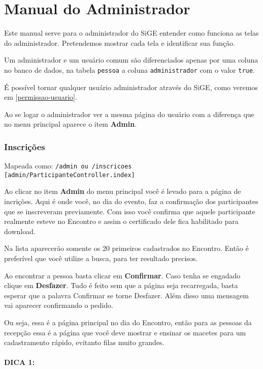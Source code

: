 \section{Manual do Administrador}

Este manual serve para o administrador do SiGE entender como funciona as
telas do administrador. Pretendemos mostrar cada tela e identificar sua
função.

Um administrador e um usuário comum são diferenciados apenas por uma
coluna no banco de dados, na tabela \texttt{pessoa} a coluna
\texttt{administrador} com o valor \texttt{true}.

É possível tornar qualquer usuário administrador através do SiGE, como
veremos em \ref{permissao-usuario}.

Ao se logar o administrador ver a mesma página do usuário com a
diferença que no menu principal aparece o item \textbf{Admin}.

\subsubsection{Inscrições \label{inscricoes}}

Mapeada como:
\texttt{/admin ou /inscricoes {[}admin/ParticipanteController.index{]}}

Ao clicar no item \textbf{Admin} do menu principal você é levado para a
página de incrições. Aqui é onde você, no dia do evento, faz a
confirmação dos participantes que se inscreveram previamente. Com isso
você confirma que aquele participante realmente esteve no Encontro e
assim o certificado dele fica habilitado para download.

Na lista aparecerão somente os 20 primeiros cadastrados no Encontro.
Então é preferível que você utilize a busca, para ter resultado
precisos.

Ao encontrar a pessoa basta clicar em \textbf{Confirmar}. Caso tenha se
engadado clique em \textbf{Desfazer}. Tudo é feito sem que a página seja
recarregada, basta esperar que a palavra Confirmar se torne Desfazer.
Além disso uma mensagem vai aparecer confirmando o pedido.

Ou seja, essa é a página principal no dia do Encontro, então para as
pessoas da recepção essa é a página que você deve mostrar e ensinar os
macetes para um cadastramento rápido, evitanto filas muito grandes.

\paragraph{DICA 1:}

